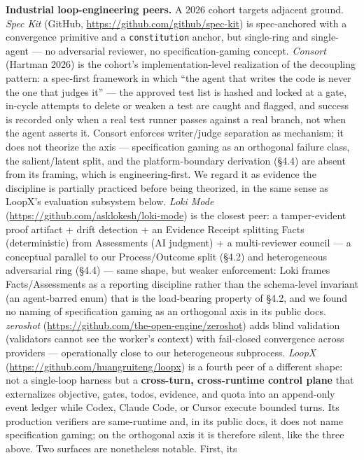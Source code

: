 \documentclass[
  11pt,
]{article}
\begin{document}
\textbf{Industrial loop-engineering peers.} A 2026 cohort targets
adjacent ground. \emph{Spec Kit} (GitHub,
\url{https://github.com/github/spec-kit}) is spec-anchored with a
convergence primitive and a \texttt{constitution} anchor, but
single-ring and single-agent --- no adversarial reviewer, no
specification-gaming concept. \emph{Consort} (Hartman 2026) is the
cohort's implementation-level realization of the decoupling pattern: a
spec-first framework in which ``the agent that writes the code is never
the one that judges it'' --- the approved test list is hashed and locked
at a gate, in-cycle attempts to delete or weaken a test are caught and
flagged, and success is recorded only when a real test runner passes
against a real branch, not when the agent asserts it. Consort enforces
writer/judge separation as mechanism; it does not theorize the axis ---
specification gaming as an orthogonal failure class, the salient/latent
split, and the platform-boundary derivation (§4.4) are absent from its
framing, which is engineering-first. We regard it as evidence the
discipline is partially practiced before being theorized, in the same
sense as LoopX's evaluation subsystem below. \emph{Loki Mode}
(\url{https://github.com/asklokesh/loki-mode}) is the closest peer: a
tamper-evident proof artifact + drift detection + an Evidence Receipt
splitting Facts (deterministic) from Assessments (AI judgment) + a
multi-reviewer council --- a conceptual parallel to our Process/Outcome
split (§4.2) and heterogeneous adversarial ring (§4.4) --- same shape,
but weaker enforcement: Loki frames Facts/Assessments as a reporting
discipline rather than the schema-level invariant (an agent-barred enum)
that is the load-bearing property of §4.2, and we found no naming of
specification gaming as an orthogonal axis in its public docs.
\emph{zeroshot} (\url{https://github.com/the-open-engine/zeroshot}) adds
blind validation (validators cannot see the worker's context) with
fail-closed convergence across providers --- operationally close to our
heterogeneous subprocess. \emph{LoopX}
(\url{https://github.com/huangruiteng/loopx}) is a fourth peer of a
different shape: not a single-loop harness but a \textbf{cross-turn,
cross-runtime control plane} that externalizes objective, gates, todos,
evidence, and quota into an append-only event ledger while Codex, Claude
Code, or Cursor execute bounded turns. Its production verifiers are
same-runtime and, in its public docs, it does not name specification
gaming; on the orthogonal axis it is therefore silent, like the three
above. Two surfaces are nonetheless notable. First, its
\end{document}
